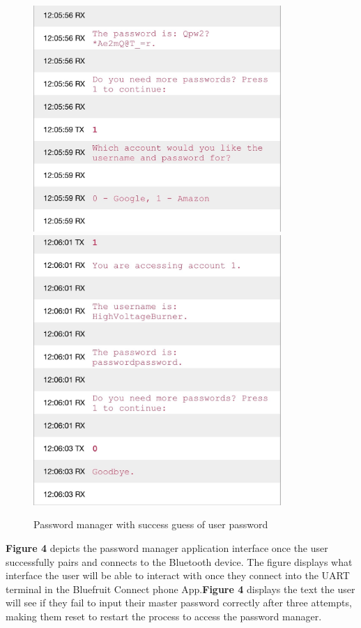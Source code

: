 \documentclass[12pt]{article}
\begin{document}
\begin{figure}[H]
\centering
\includegraphics[width=3.7in]{IMG_2454.jpg}
\includegraphics[width=3.7in]{IMG_2455.jpg}
\caption{Password manager with success guess of user password}
\label{fig:success}
\end{figure} 

\hspace{1cm}\textbf{Figure 4} depicts the password manager application interface once the user successfully pairs and connects to the Bluetooth device. The figure displays what interface the user will be able to interact with once they connect into the UART terminal in the Bluefruit Connect phone App.\textbf{Figure 4} displays the text the user will see if they fail to input their master password correctly after three attempts, making them reset to restart the process to access the password manager.\par
\end{document}
